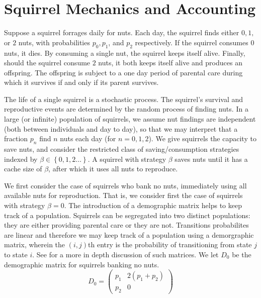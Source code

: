 \documentclass[titlepage, hidelinks, 12pt]{article}
\theoremstyle{plain}
\theoremstyle{remark}
\theoremstyle{definition}
\begin{document}
\section{Squirrel Mechanics and Accounting}
Suppose a squirrel forrages daily for nuts. Each day, the squirrel finds either $0, 1,$ or $2$ nuts, with probabilities $p_0, p_1$, and $p_2$
respectively. If the squirrel consumes $0$ nuts, it dies. By consuming a single nut, the squirrel keeps itself alive. Finally, should the squirrel
consume $2$ nuts, it both keeps itself alive and produces an offspring. The offspring is subject to a one day period of parental care during
which it survives if and only if its parent survives. 

The life of a single squirrel is a stochastic process. The squirrel's survival and reproductive events are determined by the random process of
finding nuts. In a large (or infinite) population of squirrels, we assume nut findings are independent (both between individuals and day to day),
so that we may interpret that a fraction $p_n$ find $n$ nuts each day (for $n=0,1,2$). We give squirrels the capacity to save nuts, and consider
the restricted class of saving/consumption strategies indexed by $\beta\in\left\{ 0, 1, 2 \ldots \right\}$. A squirrel with strategy $\beta$
saves nuts until it has a cache size of $\beta$, after which it uses all nuts to reproduce. 


We first consider the case of squirrels who bank no nuts, immediately using all available nuts for reproduction. That is, we consider
first the case of squirrels with strategy $\beta = 0$. 
The introduction of a demographic matrix
helps to keep track of a population. Squirrels can be segregated into two distinct populations: they are either providing parental 
care or they are not. 
Transitions probabilites are linear and therefore we may keep track of a population using a demorgraphic matrix, wherein the $(i,j)$th entry is the
probability of transitioning from state $j$ to state $i$. See \cite{stearns92} for a more in depth discussion of such matrices. 
We let $D_0$ be the demographic matrix for squirrels banking no nuts.  
\begin{equation}
D_0 =
\begin{pmatrix}
    p_1 & 2(p_1 + p_2) \\ p_2 & 0
\end{pmatrix}
    \label{eqn:D0}
\end{equation}
\end{document}
